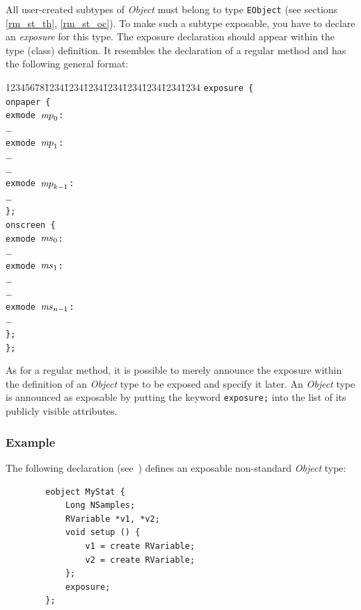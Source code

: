 All user-created subtypes of {\em Object\/} must belong to type {\tt EObject}
(see sections \ref{rm_st_th}, \ref{rm_st_oc}).
To make such a subtype exposable, you have to declare an {\em exposure\/}
for this type.
The exposure declaration should appear within the type (class) definition.
It resembles the declaration of a regular
method and has the following general format:
{\tt\begin{tabbing}
12345678\=1234\=1234\=1234\=1234\=1234\=1234\=1234\=1234\kill
\> {\tt exposure \{}\\
\> \> {\tt onpaper \{}\\
\> \> \> {\tt exmode }${\textit mp}_0${\tt :}\\
\> \> \> \> \ldots \\
\> \> \> {\tt exmode }${\textit mp}_1${\tt :}\\
\> \> \> \> \ldots \\
\> \> \> \ldots \\
\> \> \> {\tt exmode }${\textit mp}_{k-1}${\tt :}\\
\> \> \> \> \ldots \\
\> \> {\tt \};}\\
\> \> {\tt onscreen \{}\\
\> \> \> {\tt exmode }${\textit ms}_0${\tt :}\\
\> \> \> \> \ldots \\
\> \> \> {\tt exmode }${\textit ms}_1${\tt :}\\
\> \> \> \> \ldots \\
\> \> \> \ldots \\
\> \> \> {\tt exmode }${\textit ms}_{n-1}${\tt :}\\
\> \> \> \> \ldots \\
\> \> {\tt \};}\\
\> {\tt \};}
\end{tabbing}}

As for a regular method, it is possible to merely announce the
exposure within the definition of an {\em Object\/} type to be exposed and
specify it later.
An {\em Object\/} type is announced as exposable by putting the keyword
{\tt exposure;} into the list of its publicly visible attributes.

\subsubsection*{Example}

\noindent
The following declaration (see~)
defines an exposable non-standard {\em Object\/} type:
\begin{verbatim}
        eobject MyStat {
            Long NSamples;
            RVariable *v1, *v2;
            void setup () {
                v1 = create RVariable;
                v2 = create RVariable;
            };
            exposure;
        };
\end{verbatim}

